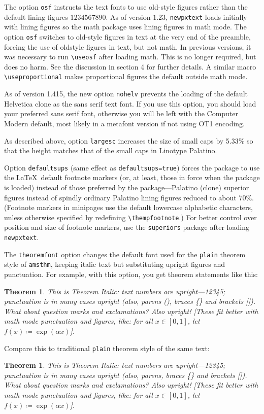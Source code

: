 \documentclass[11pt]{article}
\theoremstyle{oldplain}
\newtheorem{oldthm}{Theorem}[section]
\theoremstyle{plain}
\newtheorem{thm}{Theorem}[section]
\begin{document}
The option \texttt{osf} instructs the text fonts to use old-style figures  rather than the default lining figures $1234567890$. As of version $1.23$, {\tt newpxtext} loads initially with lining figures so the math package uses lining figures in math mode. The option {\tt osf} switches to old-style figures in text at the very end of the preamble, forcing the use of oldstyle figures in text, but not math. In previous versions, it was necessary to run 
\verb|\useosf| after loading math. This is no longer required, but does no harm. See the discussion in section 4 for further details. A similar macro \verb|\useproportional| makes proportional figures the default outside math mode. 

As of version 1.415, the new option {\tt nohelv} prevents the loading of the default Helvetica clone as the sans serif text font. If you use this option, you should load your preferred sans serif font, otherwise you will be left with the Computer Modern default, most likely in a metafont version if not using OT1 encoding.

As described above, option {\tt largesc} increases the size of small caps by  5.33\% so that the height matches that of the small caps in Linotype Palatino.

Option {\tt defaultsups} (same effect as {\tt defaultsups=true}) forces the package to use the \LaTeX\ default footnote markers (or, at least, those in force when the package is loaded) instead of those preferred by the package---Palatino (clone) superior figures instead of spindly ordinary Palatino lining figures reduced to about 70\%. (Footnote markers in minipages use the default lowercase alphabetic characters, unless otherwise specified by redefining \verb|\thempfootnote|.) For better control over position and size of footnote markers, use the {\tt superiors} package after loading {\tt newpxtext}. 

The {\tt theoremfont} option changes the default font used for the {\tt plain} theorem style of {\tt amsthm}, keeping italic text but substituting upright figures and punctuation. For example, with this option, you get theorem statements like this:

\begin{thm}
This is Theorem Italic: text numbers are upright---12345; punctuation is in many cases upright (also, parens (), braces \{\} and brackets []). What about question marks and exclamations? Also upright! [These fit better with math mode punctuation and figures, like: for all $x\in[0,1]$, let $f(x)\coloneq \exp(\alpha x)$].
\end{thm}
Compare this to traditional {\tt plain} theorem style of the same text:
\begin{oldthm}
This is Theorem Italic: text numbers are upright---12345; punctuation is in many cases upright (also, parens, braces \{\} and brackets []). What about question marks and exclamations? Also upright! [These fit better with math mode punctuation and figures, like: for all $x\in[0,1]$, let $f(x)\coloneq \exp(\alpha x)$].
\end{oldthm}
\end{document}
